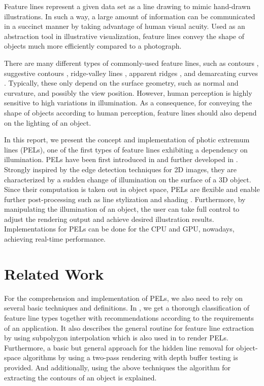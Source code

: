 \documentclass[9pt,fleqn,twoside,twocolumn]{stdglobal}
\begin{document}
  Feature lines represent a given data set as a line drawing to mimic hand-drawn illustrations.
  In such a way, a large amount of information can be communicated in a succinct manner by taking advantage of human visual acuity.
  Used as an abstraction tool in illustrative visualization, feature lines convey the shape of objects much more efficiently compared to a photograph.
  \autocite{xie2007,isenberg2003,viola2005}

  There are many different types of commonly-used feature lines, such as contours \autocite{isenberg2003}, suggestive contours \autocite{decarlo2003}, ridge-valley lines \autocite{ohtake2004}, apparent ridges \autocite{judd2007}, and demarcating curves \autocite{kolomenkin2008}.
  Typically, these only depend on the surface geometry, such as normal and curvature, and possibly the view position.
  However, human perception is highly sensitive to high variations in illumination.
  As a consequence, for conveying the shape of objects according to human perception, feature lines should also depend on the lighting of an object.
  \autocite{xie2007,zhang2011}

  In this report, we present the concept and implementation of photic extremum lines (PELs), one of the first types of feature lines exhibiting a dependency on illumination.
  PELs have been first introduced in \textcite{xie2007} and further developed in \textcite{zhang2010}.
  Strongly inspired by the edge detection techniques for 2D images, they are characterized by a sudden change of illumination on the surface of a 3D object.
  Since their computation is taken out in object space, PELs are flexible and enable further post-processing such as line stylization and shading \autocite{isenberg2003}.
  Furthermore, by manipulating the illumination of an object, the user can take full control to adjust the rendering output and achieve desired illustration results.
  Implementations for PELs can be done for the CPU and GPU, nowadays, achieving real-time performance.
  \autocite{xie2007,zhang2010}

\section{Related Work}
  For the comprehension and implementation of PELs, we also need to rely on several basic techniques and definitions.
  In \textcite{isenberg2003}, we get a thorough classification of feature line types together with recommendations according to the requirements of an application.
  It also describes the general routine for feature line extraction by using subpolygon interpolation which is also used in \textcite{zhang2010} to render PELs.
  Furthermore, a basic but general approach for the hidden line removal for object-space algorithms by using a two-pass rendering with depth buffer testing is provided.
  And additionally, using the above techniques the algorithm for extracting the contours of an object is explained.
  \autocite{isenberg2003}
\end{document}

